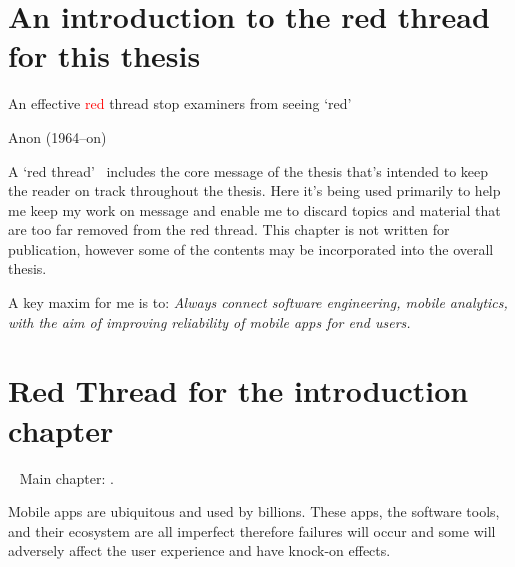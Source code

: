 \section[An introduction to the red thread for this thesis]{An introduction to the red thread for this thesis}
\label{section_read_thread} 

\epigraph{{An effective \textcolor{red}{red}} thread stop examiners from seeing `red'}{Anon (1964--on)}

A `red thread'~\footnotemark 
includes the core message of the thesis that's intended to keep the reader on track throughout the thesis. Here it's being used primarily to help me keep my work on message and enable me to discard topics and material that are too far removed from the red thread. This chapter is not written for publication, however some of the contents may be incorporated into the overall thesis.


A key maxim for me is to: \emph{Always connect software engineering, mobile analytics, with the aim of improving reliability of mobile apps for end users.}



\clearpage
\section{Red Thread for the introduction chapter}~\label{red-thread-introduction}
Main chapter: .

Mobile apps are ubiquitous and used by billions. These apps, %
the software tools, and their ecosystem are all imperfect therefore failures will occur and some will adversely affect the user experience and have knock-on effects. %

